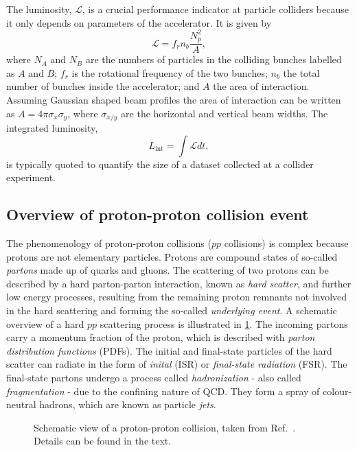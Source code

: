 The luminosity, $\mathcal{L}$, is a crucial performance indicator at particle colliders because it only depends on parameters of the accelerator.
It is given by
\begin{equation}
  \mathcal{L} = f_rn_b\frac{N_p^2}{A},
\end{equation}
where $N_A$ and $N_B$ are the numbers of particles in the colliding bunches labelled as $A$ and $B$; $f_r$ is the rotational frequency of the two bunches; $n_b$ the total number of bunches inside the accelerator; and $A$ the area of interaction. Assuming Gaussian shaped beam profiles the area of interaction can be written as $A = 4\pi \sigma_x \sigma_y$, where $\sigma_{x/y}$ are the horizontal and vertical beam widths.
The integrated luminosity, 
\begin{equation}
  L_\text{int} = \int \mathcal{L} dt,
\end{equation}
is typically quoted to quantify the size of a dataset collected at a collider experiment.

\subsection{Overview of proton-proton collision event}
The phenomenology of proton-proton collisions ($pp$ collisions) is complex because protons are not elementary particles. Protons are compound states of so-called \emph{partons} made up of quarks and gluons.
The scattering of two protons can be described by a hard parton-parton interaction, known as \emph{hard scatter}, and further low energy processes, resulting from the remaining proton remnants not involved in the hard scattering and forming the so-called \emph{underlying event}.
A schematic overview of a hard $pp$ scattering process is illustrated in \cref{fig:ppcol}.
The incoming partons carry a momentum fraction of the proton, which is described with \emph{parton distribution functions} (PDFs).
The initial and final-state particles of the hard scatter can radiate in the form of \emph{inital} (ISR) or \emph{final-state radiation} (FSR). The final-state partons undergo a process called \emph{hadronization} - also called \emph{fragmentation} - due to the confining nature of QCD. They form a spray of colour-neutral hadrons, which are known as particle \emph{jets}.

\begin{figure}
  \caption[Schematic view of a proton-proton collision.]{Schematic view of a proton-proton collision, taken from Ref.~\cite{Bhatti:2010bf}. Details can be found in the text.}
  \label{fig:ppcol}
\end{figure}


